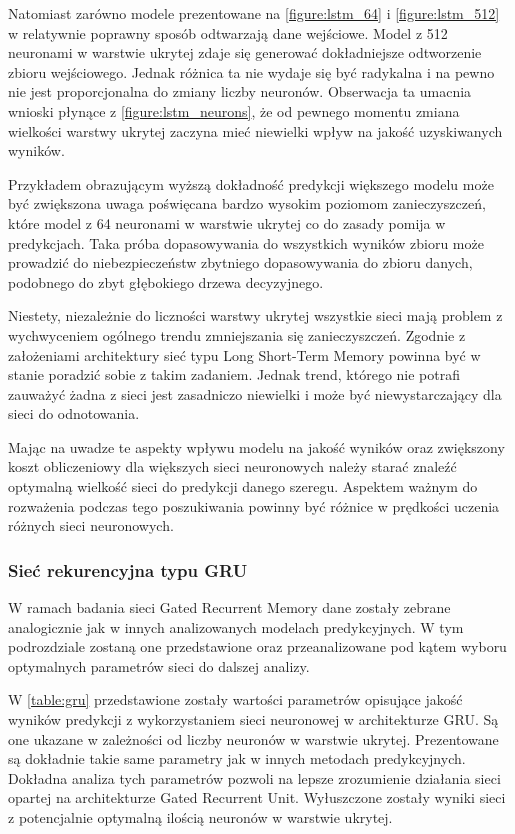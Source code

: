 \documentclass[10pt,a4paper]{article}
\begin{document}
Natomiast zarówno modele prezentowane na \autoref{figure:lstm_64} i \autoref{figure:lstm_512} w relatywnie poprawny sposób odtwarzają dane wejściowe. Model z 512 neuronami w warstwie ukrytej zdaje się generować dokładniejsze odtworzenie zbioru wejściowego. Jednak różnica ta nie wydaje się być radykalna i na pewno nie jest proporcjonalna do zmiany liczby neuronów. Obserwacja ta umacnia wnioski płynące z \autoref{figure:lstm_neurons}, że od pewnego momentu zmiana wielkości warstwy ukrytej zaczyna mieć niewielki wpływ na jakość uzyskiwanych wyników. 

Przykładem obrazującym wyższą dokładność predykcji większego modelu może być zwiększona uwaga poświęcana bardzo wysokim poziomom zanieczyszczeń, które model z 64 neuronami w warstwie ukrytej co do zasady pomija w predykcjach. Taka próba dopasowywania do wszystkich wyników zbioru może prowadzić do niebezpieczeństw zbytniego dopasowywania do zbioru danych, podobnego do zbyt głębokiego drzewa decyzyjnego.

Niestety, niezależnie do liczności warstwy ukrytej wszystkie sieci mają problem z wychwyceniem ogólnego trendu zmniejszania się zanieczyszczeń. Zgodnie z założeniami architektury sieć typu Long Short-Term Memory powinna być w stanie poradzić sobie z takim zadaniem. Jednak trend, którego nie potrafi zauważyć żadna z sieci jest zasadniczo niewielki i może być niewystarczający dla sieci do odnotowania. 

Mając na uwadze te aspekty wpływu modelu na jakość wyników oraz zwiększony koszt obliczeniowy dla większych sieci neuronowych należy starać znaleźć optymalną wielkość sieci do predykcji danego szeregu. Aspektem ważnym do rozważenia podczas tego poszukiwania powinny być różnice w prędkości uczenia różnych sieci neuronowych.

\subsubsection{Sieć rekurencyjna typu GRU}
W ramach badania sieci Gated Recurrent Memory dane zostały zebrane analogicznie jak w innych analizowanych modelach predykcyjnych. W tym podrozdziale zostaną one przedstawione oraz przeanalizowane pod kątem wyboru optymalnych parametrów sieci do dalszej analizy. 

W \autoref{table:gru} przedstawione zostały wartości parametrów opisujące jakość wyników predykcji z wykorzystaniem sieci neuronowej w architekturze GRU. Są one ukazane w zależności od liczby neuronów w warstwie ukrytej. Prezentowane są dokładnie takie same parametry jak w innych metodach predykcyjnych. Dokładna analiza tych parametrów pozwoli na lepsze zrozumienie działania sieci opartej na architekturze Gated Recurrent Unit. Wyłuszczone zostały wyniki sieci z potencjalnie optymalną ilością neuronów w warstwie ukrytej. 
\end{document}
